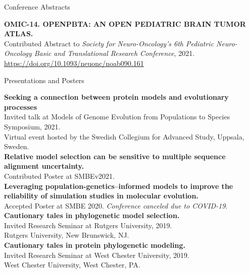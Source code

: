 \documentclass{resume} %
\begin{document}
\vspace*{0.35cm}
\begin{rSection}{Conference Abstracts}
\vspace*{0.25cm}


\textbf{OMIC-14. OPENPBTA: AN OPEN PEDIATRIC BRAIN TUMOR ATLAS.}
\\ Contributed Abstract to \emph{Society for Neuro-Oncology’s 6th Pediatric Neuro-Oncology Basic and Translational Research Conference}, 2021. \url{https://doi.org/10.1093/neuonc/noab090.161}

\end{rSection}



\vspace*{0.5cm}
\begin{rSection}{Presentations and Posters}
\vspace*{0.25cm}


\textbf{Seeking a connection between protein models and evolutionary processes}
\\ Invited talk at Models of Genome Evolution from Populations to Species Symposium, 2021.
\\ Virtual event hosted by the Swedish Collegium for Advanced Study, Uppsala, Sweden. \\ 


\textbf{Relative model selection can be sensitive to multiple sequence alignment uncertainty.}
\\ Contributed Poster at SMBEv2021. \\


\textbf{Leveraging population-genetics--informed models to improve the reliability of simulation studies in molecular evolution.}
\\ Accepted Poster at SMBE 2020. \emph{Conference canceled due to COVID-19}. \\


\textbf{Cautionary tales in phylogenetic model selection.}
\\ Invited Research Seminar at Rutgers University, 2019.
\\ Rutgers University, New Brunswick, NJ.\\


\textbf{Cautionary tales in protein phylogenetic modeling.}
\\ Invited Research Seminar at West Chester University, 2019.
\\ West Chester University, West Chester, PA.\\



\end{rSection}
\end{document}
